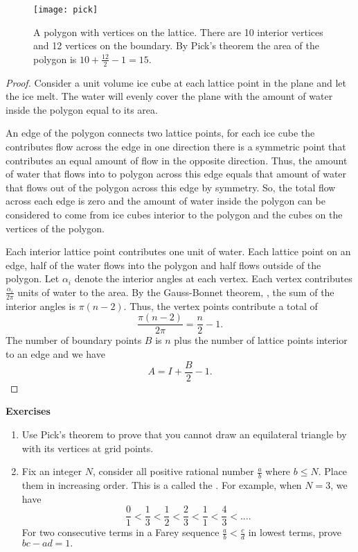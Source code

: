  \begin{figure}[htb]
         \centering
         \texttt{[image: pick]}
	\caption{A polygon with vertices on the lattice. 
	There are 10 interior vertices and 12 vertices on the boundary.
	By Pick's theorem the area of the polygon is $10+\frac{12}{2}-1=15.$
	\label{fig:picks}}
 \end{figure}
 
\begin{proof}
	Consider a unit volume ice cube at each lattice point in the plane and let the ice melt.
	The water will evenly cover the plane with the amount of water inside the polygon 
	equal to its area.
	
	An edge of the polygon connects two lattice points,
	for each ice cube the contributes flow across the edge in one direction there is a symmetric
	point that contributes an equal amount of flow in the opposite direction. Thus, 
	the amount of water that flows
	into to polygon across this edge equals that amount of water that flows out of the polygon
	across this edge by symmetry.
	So, the total flow across each edge is zero and
	the amount of water inside the polygon can be considered to come from ice cubes interior to the polygon and the cubes on the vertices
	of the polygon.
	
	Each interior lattice point contributes one unit of water. 
	Each lattice point on an edge, half of the water flows into the polygon and
	half flows outside of the polygon.
	Let $\alpha_i$ denote the interior angles at each vertex.
	Each vertex contributes $\frac{\alpha_i}{2\pi}$ units of water to the area.
	By the Gauss-Bonnet theorem, , the sum of the interior
	angles is $\pi(n-2)$. Thus, the vertex points contribute a total of 
	$$\frac{\pi(n-2)}{2\pi}=\frac{n}{2}-1.$$
	The number of boundary points $B$ is $n$ plus the number of lattice points interior to an edge
	and we have
	$$A=I+\frac{B}{2}-1.$$
	
\end{proof}


\noindent \textbf{Exercises}


\begin{enumerate}
	\item Use Pick's theorem to prove that you cannot draw an equilateral triangle by with its vertices
	at grid points.
	
	\item Fix an integer $N$, consider all positive rational number $\frac{a}{b}$ where
	$b\leq N$. Place them in increasing order. This is a called the .
	For example, when $N=3$, we have
	$$\frac{0}{1}<\frac{1}{3}<\frac{1}{2}<\frac{2}{3}<\frac{1}{1}<\frac{4}{3}<\ldots.$$
	For two consecutive terms in a Farey sequence $\frac{a}{b}<\frac{c}{d}$ in lowest terms,
	prove $bc-ad=1.$
	
\end{enumerate}

\pagebreak
